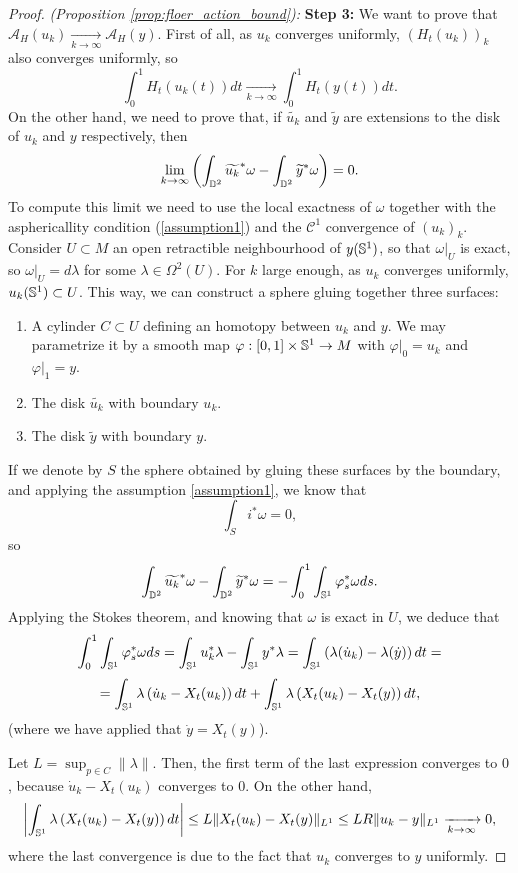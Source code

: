 \begin{proof} {\it (Proposition \ref{prop:floer_action_bound}):}
{\bf Step 3:} We want to prove that $\mathcal{A}_H(u_k) \xrightarrow[k\rightarrow\infty]{} \mathcal{A}_H(y)$. First of all, as $u_k$ converges uniformly, $(H_t(u_k))_k$ also converges uniformly, so
\[\int_0^1 H_t(u_k(t))dt \xrightarrow[k\rightarrow\infty]{} \int_0^1 H_t(y(t))dt .\]
On the other hand, we need to prove that, if $\widetilde{u_k}$ and $\widetilde{y}$ are extensions to the disk of $u_k$ and $y$ respectively, then
\[\lim_{k\rightarrow\infty} \left( \int_{\mathbb{D}^2} \widetilde{u_k}^{\ast} \omega - \int_{\mathbb{D}^2} \widetilde{y}^{\ast} \omega \right) = 0 .\]
To compute this limit we need to use the local exactness of $\omega$ together with the asphericallity condition (\ref{assumption1}) and the $\mathcal{C}^1$ convergence of $(u_k)_k$. Consider $U \subset M$ an open retractible neighbourhood of $y(\mathbb{S}^1)$, so that $\left.\omega\right|_U$ is exact, so $\left.\omega\right|_U = d\lambda$ for some $\lambda \in \Omega^2(U)$. For $k$ large enough, as $u_k$ converges uniformly, $u_k(\mathbb{S}^1) \subset U$. This way, we can construct a sphere gluing together three surfaces:
\begin{enumerate}
	\item A cylinder $C \subset U$ defining an homotopy between $u_k$ and $y$. We may parametrize it by a smooth map $\varphi : [0,1] \times \mathbb{S}^1 \rightarrow M$ with $\left.\varphi\right|_0 = u_k$ and $\left.\varphi\right|_1 = y$.
	\item The disk $\widetilde{u_k}$ with boundary $u_k$.
	\item The disk $\widetilde{y}$ with boundary $y$.
\end{enumerate}
If we denote by $S$ the sphere obtained by gluing these surfaces by the boundary, and applying the assumption \ref{assumption1}, we know that
\[\int_S i^{\ast} \omega = 0 ,\]
so
\[\int_{\mathbb{D}^2} \widetilde{u_k}^{\ast} \omega - \int_{\mathbb{D}^2} \widetilde{y}^{\ast} \omega = - \int_0^1 \int_{\mathbb{S}^1} \varphi_s^{\ast}\omega ds .\]
Applying the Stokes theorem, and knowing that $\omega$ is exact in $U$, we deduce that
\[\int_0^1 \int_{\mathbb{S}^1} \varphi_s^{\ast}\omega ds = \int_{\mathbb{S}^1} u_k^{\ast} \lambda - \int_{\mathbb{S}^1} y^{\ast} \lambda = \int_{\mathbb{S}^1} \left( \lambda(\dot{u}_k) - \lambda(\dot{y}) \right) dt =\]
\[= \int_{\mathbb{S}^1} \lambda\left( \dot{u}_k - X_t(u_k) \right) dt + \int_{\mathbb{S}^1} \lambda\left( X_t(u_k) - X_t(y) \right) dt ,\]
(where we have applied that $\dot{y} = X_t(y)$).

Let $L = \sup_{p \in C} \|\lambda\|$. Then, the first term of the last expression converges to $0$, because $\dot{u}_k - X_t(u_k)$ converges to $0$. On the other hand,
\[\left| \int_{\mathbb{S}^1}\lambda \left(X_t(u_k) - X_t(y)\right)dt \right| \leq L \|X_t(u_k) - X_t(y)\|_{L^1} \leq L R \|u_k - y\|_{L^1} \xrightarrow[k\rightarrow\infty]{} 0,\]
where the last convergence is due to the fact that $u_k$ converges to $y$ uniformly.
\end{proof}
